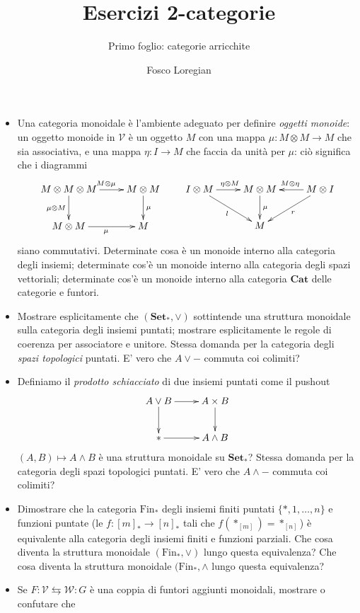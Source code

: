 \documentclass[a4paper,10pt]{amsart}
\title{Esercizi 2-categorie}
\subtitle{Primo foglio: categorie arricchite}
\author{Fosco Loregian}
\def\V{\mathcal{V}}
\def\Cat{\mathbf{Cat}}
\begin{document}
\maketitle
\begin{itemize}
	\item Una categoria monoidale è l'ambiente adeguato per definire \emph{oggetti monoide}: un oggetto monoide in $\V$ è un oggetto $M$ con una mappa $\mu : M\otimes M\to M$ che sia associativa, e una mappa $\eta : I\to M$ che faccia da unità per $\mu$: ciò significa che i diagrammi
	\[\xymatrix{
	M\otimes M\otimes M \ar[r]^{M\otimes\mu}\ar[d]_{\mu\otimes M}& M\otimes M \ar[d]^\mu\\
	M\otimes M \ar[r]_\mu & M
	}\qquad 
	\xymatrix{
	I\otimes M\ar[dr]_l \ar[r]^{\eta\otimes M}& M\otimes M \ar[d]^\mu & M\otimes I \ar[l]_{M\otimes \eta}\ar[dl]^r \\
	& M &
	}\] siano commutativi. Determinate cosa è un monoide interno alla categoria degli insiemi; determinate cos'è un monoide interno alla categoria degli spazi vettoriali; determinate cos'è un monoide interno alla categoria $\Cat$ delle categorie e funtori.
	\item Mostrare esplicitamente che $(\mathbf{Set}_*,\lor)$ sottintende una struttura monoidale sulla categoria degli insiemi puntati; mostrare esplicitamente le regole di coerenza per associatore e unitore. Stessa domanda per la categoria degli \emph{spazi topologici} puntati. E' vero che $A\lor -$ commuta coi colimiti?
	\item Definiamo il \emph{prodotto schiacciato} di due insiemi puntati come il pushout
	\[\xymatrix{A\lor B \ar[r]\ar[d]& A\times B\ar[d] \\ {*}\ar[r] & A\land B}\]
	$(A,B)\mapsto A\land B$ è una struttura monoidale su $\mathbf{Set}_*$? Stessa domanda per la categoria degli spazi topologici puntati. E' vero che $A\land -$ commuta coi colimiti?
	\item Dimostrare che la categoria $\text{Fin}_*$ degli insiemi finiti puntati $\{*,1,\dots,n\}$ e funzioni puntate (le $f : [m]_*\to [n]_*$ tali che $f(*_{[m]})=*_{[n]}$) è equivalente alla categoria degli insiemi finiti e funzioni parziali. Che cosa diventa la struttura monoidale $(\text{Fin}_*,\lor)$ lungo questa equivalenza? Che cosa diventa la struttura monoidale $(\text{Fin}_*,\land$ lungo questa equivalenza?
	\item Se $F : \V \leftrightarrows \mathcal{W} : G$ è una coppia di funtori aggiunti monoidali, mostrare o confutare che
	\begin{itemize}

\end{itemize}
\end{itemize}
\end{document}
